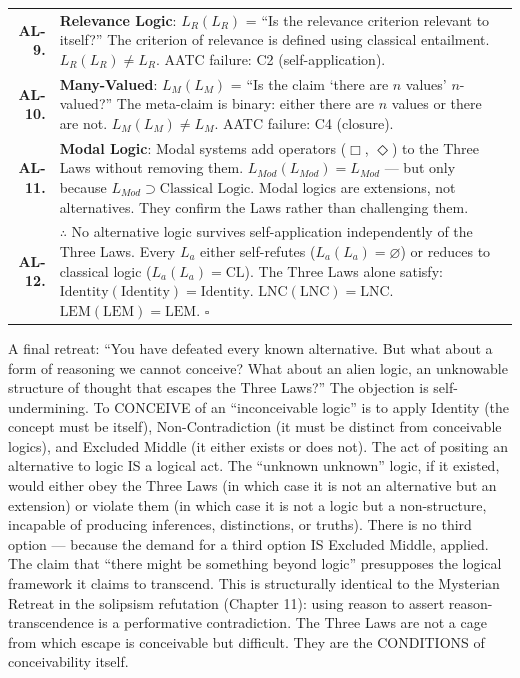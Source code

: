 \documentclass[10pt, openany, oneside]{book}
\begin{document}
{\begin{tabular}{r p{}}
\textbf{AL-9.} & \textbf{Relevance Logic}: $L_R(L_R)$ = ``Is the relevance criterion relevant to itself?'' The criterion of relevance is defined using classical entailment. $L_R(L_R) \neq L_R$. AATC failure: C2 (self-application). \\[0.3em]
\textbf{AL-10.} & \textbf{Many-Valued}: $L_M(L_M)$ = ``Is the claim `there are $n$ values' $n$-valued?'' The meta-claim is binary: either there are $n$ values or there are not. $L_M(L_M) \neq L_M$. AATC failure: C4 (closure). \\[0.3em]
\textbf{AL-11.} & \textbf{Modal Logic}: Modal systems add operators ($\Box$, $\Diamond$) to the Three Laws without removing them. $L_{Mod}(L_{Mod}) = L_{Mod}$ --- but only because $L_{Mod} \supset \text{Classical Logic}$. Modal logics are extensions, not alternatives. They confirm the Laws rather than challenging them. \\[0.3em]
\textbf{AL-12.} & $\therefore$ No alternative logic survives self-application independently of the Three Laws. Every $L_a$ either self-refutes ($L_a(L_a) = \varnothing$) or reduces to classical logic ($L_a(L_a) = \text{CL}$). The Three Laws alone satisfy: $\text{Identity}(\text{Identity}) = \text{Identity}$. $\text{LNC}(\text{LNC}) = \text{LNC}$. $\text{LEM}(\text{LEM}) = \text{LEM}$. $\square$ \\[0.3em]
\end{tabular}
}

\vspace{0.8em}

\noindent A final retreat: ``You have defeated every known alternative. But what about a form of reasoning we cannot conceive? What about an alien logic, an unknowable structure of thought that escapes the Three Laws?'' The objection is self-undermining. To CONCEIVE of an ``inconceivable logic'' is to apply Identity (the concept must be itself), Non-Contradiction (it must be distinct from conceivable logics), and Excluded Middle (it either exists or does not). The act of positing an alternative to logic IS a logical act. The ``unknown unknown'' logic, if it existed, would either obey the Three Laws (in which case it is not an alternative but an extension) or violate them (in which case it is not a logic but a non-structure, incapable of producing inferences, distinctions, or truths). There is no third option --- because the demand for a third option IS Excluded Middle, applied. The claim that ``there might be something beyond logic'' presupposes the logical framework it claims to transcend. This is structurally identical to the Mysterian Retreat in the solipsism refutation (Chapter 11): using reason to assert reason-transcendence is a performative contradiction. The Three Laws are not a cage from which escape is conceivable but difficult. They are the CONDITIONS of conceivability itself.
\end{document}
